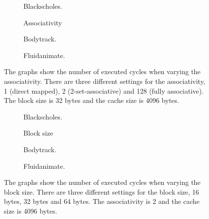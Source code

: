\begin{figure}[H]
    \centering
    \begin{subfigure}[b]{0.33\textwidth}
        \centering
        \caption{Blackscholes.}\label{fig:associativity_blackscholes_advanced}
    \end{subfigure}%
    \hfill
    \begin{subfigure}[b]{0.33\textwidth}
        \centering
        Associativity\par\medskip
        \caption{Bodytrack.}\label{fig:associativity_bodytrack_advanced}
    \end{subfigure}%
    \hfill
    \begin{subfigure}[b]{0.33\textwidth}
        \centering
        \caption{Fluidanimate.}\label{fig:associativity_fluidanimate_advanced}
    \end{subfigure}
    \hfill
    \caption{The graphs show the number of executed cycles when varying the associativity. There are three different settings for the associativity, 1 (direct mapped), 2 (2-set-associative) and 128 (fully associative). The block size is 32 bytes and the cache size is 4096 bytes.}\label{fig:associativity_advanced}
\end{figure}

\begin{figure}[H]
    \centering
    \begin{subfigure}[b]{0.33\textwidth}
        \centering
        \caption{Blackscholes.}\label{fig:block_size_blackscholes_advanced}
    \end{subfigure}%
    \hfill
    \begin{subfigure}[b]{0.33\textwidth}
        \centering
        Block size\par\medskip
        \caption{Bodytrack.}\label{fig:block_size_bodytrack_advanced}
    \end{subfigure}%
    \hfill
    \begin{subfigure}[b]{0.33\textwidth}
        \centering
        \caption{Fluidanimate.}\label{fig:block_size_fluidanimate_advanced}
    \end{subfigure}
    \hfill
    \caption{The graphs show the number of executed cycles when varying the block size. There are three different settings for the block size, 16 bytes, 32 bytes and 64 bytes. The associativity is 2 and the cache size is 4096 bytes.}\label{fig:block_size_advanced}
\end{figure}

